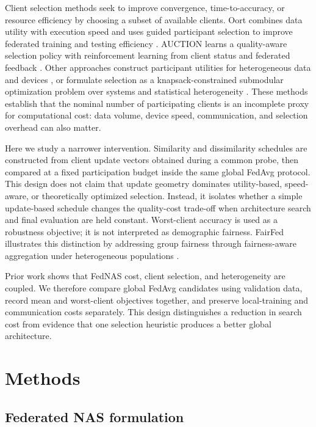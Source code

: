 \documentclass[11pt]{article}
\begin{document}
Client selection methods seek to improve convergence, time-to-accuracy, or resource efficiency by choosing a subset of available clients. Oort combines data utility with execution speed and uses guided participant selection to improve federated training and testing efficiency \cite{lai2021oort}. AUCTION learns a quality-aware selection policy with reinforcement learning from client status and federated feedback \cite{deng2022auction}. Other approaches construct participant utilities for heterogeneous data and devices \cite{zhao2023newt}, or formulate selection as a knapsack-constrained submodular optimization problem over systems and statistical heterogeneity \cite{zhang2024submodular}. These methods establish that the nominal number of participating clients is an incomplete proxy for computational cost: data volume, device speed, communication, and selection overhead can also matter.

Here we study a narrower intervention. Similarity and dissimilarity schedules are constructed from client update vectors obtained during a common probe, then compared at a fixed participation budget inside the same global FedAvg protocol. This design does not claim that update geometry dominates utility-based, speed-aware, or theoretically optimized selection. Instead, it isolates whether a simple update-based schedule changes the quality-cost trade-off when architecture search and final evaluation are held constant. Worst-client accuracy is used as a robustness objective; it is not interpreted as demographic fairness. FairFed illustrates this distinction by addressing group fairness through fairness-aware aggregation under heterogeneous populations \cite{ezzeldin2023fairfed}.

Prior work shows that FedNAS cost, client selection, and heterogeneity are coupled. We therefore compare global FedAvg candidates using validation data, record mean and worst-client objectives together, and preserve local-training and communication costs separately. This design distinguishes a reduction in search cost from evidence that one selection heuristic produces a better global architecture.

\section{Methods}

\subsection{Federated NAS formulation}
\end{document}
